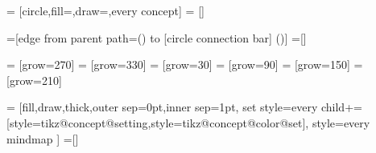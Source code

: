 

\def\tikz@compute@rotation{%
  \pgf@process{\pgfpointnormalised{\pgfpointdiff{\pgfpointanchor{\tikztostart}{center}}{\pgfpointanchor{\tikztotarget}{center}}}}%
  \pgf@ya=-\pgf@y%
  \edef\pgf@marshal{%
    \noexpand\pgfsetadditionalshadetransform{%
      \noexpand\pgftransformcm
      {\pgf@sys@tonumber{\pgf@x}}{\pgf@sys@tonumber{\pgf@y}}%
      {\pgf@sys@tonumber{\pgf@ya}}{\pgf@sys@tonumber{\pgf@x}}%
      {\noexpand\pgfpointorigin}%
    }%
  }%
  \pgf@marshal%
}





=          [circle,fill=\tikz@concept@color,draw=\tikz@concept@color,every concept]
=    []

\def\tikz@concept@color{black}

=[edge from parent path={(\tikzparentnode) to [circle connection bar] (\tikzchildnode)}]
=[]




=            [grow=270]
=            [grow=330]
=            [grow=30]
=            [grow=90]
=            [grow=150]
=            [grow=210]



=
  [fill,draw,thick,outer sep=0pt,inner sep=1pt,%
   set style={{every child}+=[style=tikz@concept@setting,style=tikz@concept@color@set]},%
   style=every mindmap%
 ]
=[]



\endinput





\pgfdeclarehorizontalshading[current]{bar}{100bp}{%
  color(0pt)=(neutral.bg);
  color(30bp)=(neutral.bg);
  color(70bp)=(current);
  color(100bp)=(current)}

